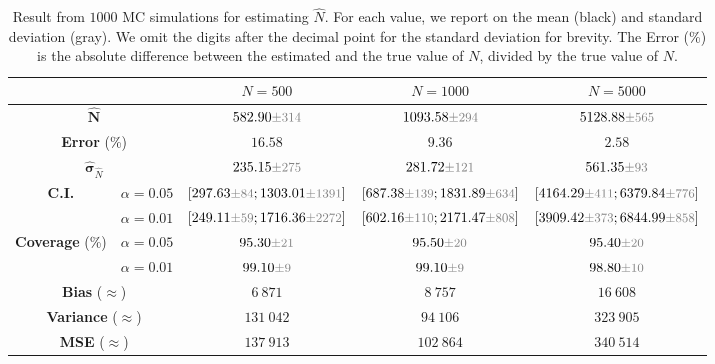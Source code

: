 \documentclass{article}
\newcommand{\variance}[1]{\ensuremath{\text{\small \textcolor{gray}{$\pm #1$}}}}
\begin{document}
\begin{table}[h]
    \centering 
    \caption*{$p_i \sim 0.01 \cdot \mathrm{Beta}(2, 2)$}
    \begin{tabular}{c c|c c c}
        \toprule
        & & \multicolumn{1}{|c|}{${N}=500$} & \multicolumn{1}{c|}{${N}=1000$} & \multicolumn{1}{c}{${N}=5000$} \\
        \midrule
        \multicolumn{2}{c|}{${\hat{\mathbf{N}}}$} & $582.90 \variance{314}$ & $1093.58 \variance{294}$ & $5128.88 \variance{565}$  \\
        \multicolumn{2}{c|}{\textbf{Error} (\%)} & $16.58$ & $9.36$ & $2.58$ \\
        \multicolumn{2}{c|}{${\hat{\mathbf{\sigma}}}_{\hat{N}}$} & $235.15 \variance{275}$ & $281.72 \variance{121}$ & $561.35 \variance{93}$\\
        \multirow{2}{*}{\textbf{C.I.}} & $\alpha = 0.05$ & $[297.63 \variance{84}; 1303.01 \variance{1391}]$ & $[687.38 \variance{139}; 1831.89 \variance{634}]$ & $[4164.29 \variance{411}; 6379.84 \variance{776}]$
        \\
        & $\alpha = 0.01$ & $[249.11 \variance{59}; 1716.36 \variance{2272}]$ & $[602.16 \variance{110}; 2171.47 \variance{808}]$ & $[3909.42 \variance{373}; 6844.99 \variance{858}]$ \\
        \midrule
        \multirow{2}{*}{\textbf{Coverage} (\%)} & $\alpha = 0.05$ & $95.30 \variance{21}$ & $95.50 \variance{20}$ & $95.40 \variance{20}$ \\
        & $\alpha = 0.01$ & $99.10 \variance{9}$ & $99.10 \variance{9}$ & $98.80 \variance{10}$ \\
        \multicolumn{2}{c|}{\textbf{Bias} ($\approx$)} & $6\ 871$ & $8\ 757$ & $16\ 608$ \\
        \multicolumn{2}{c|}{\textbf{Variance} ($\approx$)} & $131\ 042$ & $94\ 106$ & $323\ 905$ \\
        \multicolumn{2}{c|}{\textbf{MSE} ($\approx$)} & $137\ 913$ & $102\ 864$ & $340\ 514$ \\
        \bottomrule
    \end{tabular}
    \caption{Result from $1000$ MC simulations for estimating $\hat{N}$. For each value, we report on the mean (black) and standard deviation (gray). We omit the digits after the decimal point for the standard deviation for brevity.
    The Error (\%) is the absolute difference between the estimated and the true value of $N$, divided by the true value of $N$.}
    \label{tab:problem_2_results_beta_2_2}
\end{table}
\end{document}
